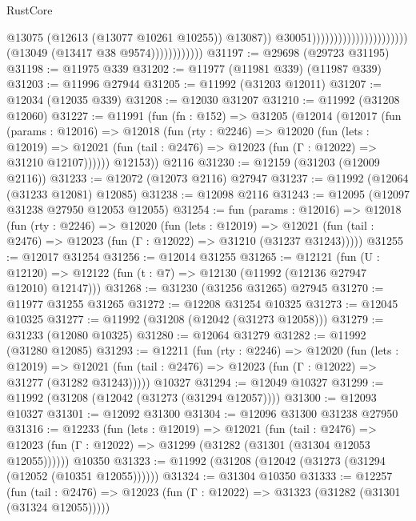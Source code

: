 \begin{lexlean}{RustCore}
\begin{coremodule}
                                                                        @13075
                                                                        (@12613
                                                                          (@13077 @10261 @10255))
                                                                        @13087))
                                                                    @30051))))))))))))))))))))))
                        (@13049 (@13417 @38 @9574))))))))))))
@31197 := @29698 (@29723 @31195)
@31198 := @11975 @339
@31202 := @11977 (@11981 @339) (@11987 @339)
@31203 := @11996 @27944
@31205 := @11992 (@31203 @12011)
@31207 := @12034 (@12035 @339)
@31208 := @12030 @31207
@31210 := @11992 (@31208 @12060)
@31227 := @11991
    (fun (fn : @152) =>
    @31205
      (@12014
        (@12017
          (fun (params : @12016) =>
          @12018
            (fun (rty : @2246) =>
            @12020
              (fun (lets : @12019) =>
              @12021 (fun (tail : @2476) => @12023 (fun (Γ : @12022) => @31210 @12107))))))
        @12153))
    @2116
@31230 := @12159 (@31203 (@12009 @2116))
@31233 := @12072 (@12073 @2116) @27947
@31237 := @11992 (@12064 (@31233 @12081) @12085)
@31238 := @12098 @2116
@31243 := @12095 (@12097 @31238 @27950 @12053 @12055)
@31254 := fun (params : @12016) =>
  @12018
    (fun (rty : @2246) =>
    @12020
      (fun (lets : @12019) =>
      @12021 (fun (tail : @2476) => @12023 (fun (Γ : @12022) => @31210 (@31237 @31243)))))
@31255 := @12017 @31254
@31256 := @12014 @31255
@31265 := @12121
    (fun (U : @12120) => @12122 (fun (t : @7) => @12130 (@11992 (@12136 @27947 @12010) @12147)))
@31268 := @31230 (@31256 @31265) @27945
@31270 := @11977 @31255 @31265
@31272 := @12208 @31254 @10325
@31273 := @12045 @10325
@31277 := @11992 (@31208 (@12042 (@31273 @12058)))
@31279 := @31233 (@12080 @10325)
@31280 := @12064 @31279
@31282 := @11992 (@31280 @12085)
@31293 := @12211
    (fun (rty : @2246) =>
    @12020
      (fun (lets : @12019) =>
      @12021 (fun (tail : @2476) => @12023 (fun (Γ : @12022) => @31277 (@31282 @31243)))))
    @10327
@31294 := @12049 @10327
@31299 := @11992 (@31208 (@12042 (@31273 (@31294 @12057))))
@31300 := @12093 @10327
@31301 := @12092 @31300
@31304 := @12096 @31300 @31238 @27950
@31316 := @12233
    (fun (lets : @12019) =>
    @12021
      (fun (tail : @2476) =>
      @12023 (fun (Γ : @12022) => @31299 (@31282 (@31301 (@31304 @12053 @12055))))))
    @10350
@31323 := @11992 (@31208 (@12042 (@31273 (@31294 (@12052 (@10351 @12055))))))
@31324 := @31304 @10350
@31333 := @12257
    (fun (tail : @2476) => @12023 (fun (Γ : @12022) => @31323 (@31282 (@31301 (@31324 @12055)))))

\end{coremodule}
\end{lexlean}
